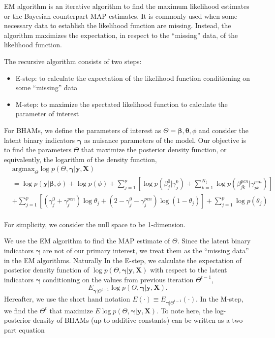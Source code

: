\documentclass[AMA,STIX1COL,]{WileyNJD-v2}
\providecommand{\tightlist}{%
  \setlength{\itemsep}{0pt}\setlength{\parskip}{0pt}}
\begin{document}
EM algorithm is an iterative algorithm to find the maximum likelihood
estimates or the Bayesian counterpart MAP estimates. It is commonly used
when some necessary data to establish the likelihood function are
missing. Instead, the algorithm maximizes the expectation, in respect to
the ``missing'' data, of the likelihood function.

The recursive algorithm consists of two steps:

\begin{itemize}
\tightlist
\item
  E-step: to calculate the expectation of the likelihood function
  conditioning on some ``missing'' data
\item
  M-step: to maximize the spectated likelihood function to calculate the
  parameter of interest
\end{itemize}

For BHAMs, we define the parameters of interest as
\(\Theta = {\boldsymbol{\beta}, \boldsymbol{\theta}, \phi}\) and
consider the latent binary indicators \(\boldsymbol{\gamma}\) as
nuisance parameters of the model. Our objective is to find the
parameters \(\Theta\) that maximize the posterior density function, or
equivalently, the logarithm of the density function, \[
\begin{aligned}
& \text{argmax}_{\Theta}
\log p(\Theta, \boldsymbol{\gamma}| \textbf{y}, \textbf{X}) \\
&= \log p(\textbf{y}|\boldsymbol{\beta}, \phi) + \log p(\phi) + \sum\limits_{j=1}^p\left[\log p(\beta^0_j|\gamma^0_j)+\sum\limits_{k=1}^{K_j} \log p(\beta^{pen}_{jk}|\gamma^{pen}_{jk})\right]\\
& +\sum\limits_{j=1}^{p} \left[ (\gamma^0_j+\gamma_{j}^{pen})\log \theta_j + (2-\gamma^0_j-\gamma_{j}^{pen}) \log (1-\theta_j)\right] +  \sum\limits_{j=1}^{p}\log p(\theta_j)
\end{aligned}
\]\\
For simplicity, we consider the null space to be 1-dimension.

We use the EM algorithm to find the MAP estimate of \(\Theta\). Since
the latent binary indicators \(\boldsymbol{\gamma}\) are not of our
primary interest, we treat them as the ``missing data'' in the EM
algorithms. Naturally In the E-step, we calculate the expectation of
posterior density function of
\(\log p(\Theta, \boldsymbol{\gamma}| \textbf{y}, \textbf{X})\) with
respect to the latent indicators \(\boldsymbol{\gamma}\) conditioning on
the values from previous iteration \(\Theta^{t-1}\), \[
E_{\boldsymbol{\gamma}|\Theta^{t-1}}\log p(\Theta, \boldsymbol{\gamma}| \textbf{y}, \textbf{X}) .
\] Hereafter, we use the short hand notation
\(E(\cdot)\equiv E_{\boldsymbol{\gamma}|\Theta^{t-1}}(\cdot)\). In the
M-step, we find the \(\Theta^{t}\) that maximize
\(E\log p(\Theta, \boldsymbol{\gamma}| \textbf{y}, \textbf{X})\). To
note here, the log-posterior density of BHAMs (up to additive constants)
can be written as a two-part equation
\end{document}
